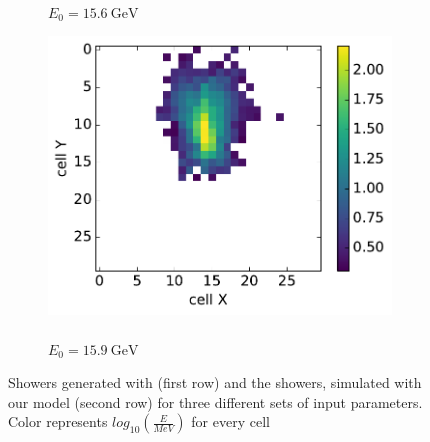 \begin{figure}
\begin{subfigure}{0.24\textwidth}
    \caption{\\$E_0 = 15.6~\text{GeV}$ }%
  \end{subfigure}
  \begin{subfigure}{0.24\textwidth}
    \centering
    \includegraphics[width=1\textwidth]{figures/4_gen.pdf}
    \caption{\\$E_0 = 15.9~\text{GeV}$ }%
  \end{subfigure}
 
  \caption{Showers generated with \geant (first row) and the showers,
    simulated with our model (second row) for three different sets of
    input parameters. Color represents $log_{10}(\frac{E}{MeV})$ for every cell}
  \label{fig:geant_vs_ours}
\end{figure}

